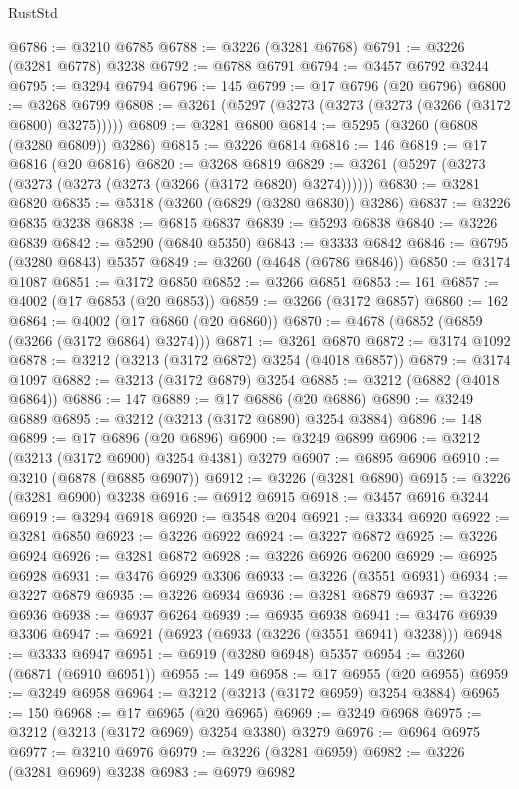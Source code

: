 \begin{lexlean}{RustStd}
\begin{coremodule}
@6786 := @3210 @6785
@6788 := @3226 (@3281 @6768)
@6791 := @3226 (@3281 @6778) @3238
@6792 := @6788 @6791
@6794 := @3457 @6792 @3244
@6795 := @3294 @6794
@6796 := 145
@6799 := @17 @6796 (@20 @6796)
@6800 := @3268 @6799
@6808 := @3261 (@5297 (@3273 (@3273 (@3273 (@3266 (@3172 @6800) @3275)))))
@6809 := @3281 @6800
@6814 := @5295 (@3260 (@6808 (@3280 @6809)) @3286)
@6815 := @3226 @6814
@6816 := 146
@6819 := @17 @6816 (@20 @6816)
@6820 := @3268 @6819
@6829 := @3261 (@5297 (@3273 (@3273 (@3273 (@3273 (@3266 (@3172 @6820) @3274))))))
@6830 := @3281 @6820
@6835 := @5318 (@3260 (@6829 (@3280 @6830)) @3286)
@6837 := @3226 @6835 @3238
@6838 := @6815 @6837
@6839 := @5293 @6838
@6840 := @3226 @6839
@6842 := @5290 (@6840 @5350)
@6843 := @3333 @6842
@6846 := @6795 (@3280 @6843) @5357
@6849 := @3260 (@4648 (@6786 @6846))
@6850 := @3174 @1087
@6851 := @3172 @6850
@6852 := @3266 @6851
@6853 := 161
@6857 := @4002 (@17 @6853 (@20 @6853))
@6859 := @3266 (@3172 @6857)
@6860 := 162
@6864 := @4002 (@17 @6860 (@20 @6860))
@6870 := @4678 (@6852 (@6859 (@3266 (@3172 @6864) @3274)))
@6871 := @3261 @6870
@6872 := @3174 @1092
@6878 := @3212 (@3213 (@3172 @6872) @3254 (@4018 @6857))
@6879 := @3174 @1097
@6882 := @3213 (@3172 @6879) @3254
@6885 := @3212 (@6882 (@4018 @6864))
@6886 := 147
@6889 := @17 @6886 (@20 @6886)
@6890 := @3249 @6889
@6895 := @3212 (@3213 (@3172 @6890) @3254 @3884)
@6896 := 148
@6899 := @17 @6896 (@20 @6896)
@6900 := @3249 @6899
@6906 := @3212 (@3213 (@3172 @6900) @3254 @4381) @3279
@6907 := @6895 @6906
@6910 := @3210 (@6878 (@6885 @6907))
@6912 := @3226 (@3281 @6890)
@6915 := @3226 (@3281 @6900) @3238
@6916 := @6912 @6915
@6918 := @3457 @6916 @3244
@6919 := @3294 @6918
@6920 := @3548 @204
@6921 := @3334 @6920
@6922 := @3281 @6850
@6923 := @3226 @6922
@6924 := @3227 @6872
@6925 := @3226 @6924
@6926 := @3281 @6872
@6928 := @3226 @6926 @6200
@6929 := @6925 @6928
@6931 := @3476 @6929 @3306
@6933 := @3226 (@3551 @6931)
@6934 := @3227 @6879
@6935 := @3226 @6934
@6936 := @3281 @6879
@6937 := @3226 @6936
@6938 := @6937 @6264
@6939 := @6935 @6938
@6941 := @3476 @6939 @3306
@6947 := @6921 (@6923 (@6933 (@3226 (@3551 @6941) @3238)))
@6948 := @3333 @6947
@6951 := @6919 (@3280 @6948) @5357
@6954 := @3260 (@6871 (@6910 @6951))
@6955 := 149
@6958 := @17 @6955 (@20 @6955)
@6959 := @3249 @6958
@6964 := @3212 (@3213 (@3172 @6959) @3254 @3884)
@6965 := 150
@6968 := @17 @6965 (@20 @6965)
@6969 := @3249 @6968
@6975 := @3212 (@3213 (@3172 @6969) @3254 @3380) @3279
@6976 := @6964 @6975
@6977 := @3210 @6976
@6979 := @3226 (@3281 @6959)
@6982 := @3226 (@3281 @6969) @3238
@6983 := @6979 @6982

\end{coremodule}
\end{lexlean}
